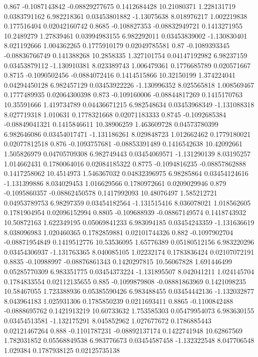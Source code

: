{0.867 -0.1087143842 -0.08829277675 0.1412684428 10.21080371 1.228131719 0.0383791162 6.982218361 0.03453801882 -1.13075638 8.018976217 1.002219838 0.177516404 0.02042160742
0.8685 -0.108827353 -0.08832949721 0.1413271955 10.2489279 1.27839461 0.03994983155 6.982292011 0.03453839002 -1.130830401 8.021192666 1.004362265 0.1775910179 0.02049785581
0.87 -0.1089393345 -0.08836766749 0.141388268 10.2858335 1.327101754 0.04147192982 6.98237159 0.03453879112 -1.130910381 8.023389743 1.006479361 0.1776685789 0.020571667
0.8715 -0.1090502456 -0.0884072416 0.1414515866 10.32150199 1.374224041 0.04294450128 6.982457129 0.03453922226 -1.130996352 8.025565818 1.008569467 0.1777489935 0.02064300398
0.873 -0.109160006 -0.08844817269 0.1415170763 10.35591666 1.419734789 0.04436671215 6.982548634 0.03453968349 -1.131088318 8.027719318 1.010631 0.1778321668 0.02071183333
0.8745 -0.1092685384 -0.08849041321 0.1415846611 10.38906259 1.463609728 0.04573780399 6.982646086 0.03454017471 -1.131186261 8.029848723 1.012662462 0.1779180021 0.02077812518
0.876 -0.1093757681 -0.08853391489 0.1416542638 10.42092661 1.505826979 0.04705709308 6.982749443 0.03454069571 -1.131290139 8.03195257 1.014662431 0.1780064016 0.02084185322
0.8775 -0.1094816235 -0.08857862888 0.1417258062 10.4514973 1.546367032 0.04832396975 6.98285864 0.03454124616 -1.131399886 8.034029453 1.016629566 0.1780972661 0.0209029946
0.879 -0.1095860357 -0.08862450578 0.1417992093 10.48076497 1.585212721 0.04953789753 6.98297359 0.03454182564 -1.131515416 8.036078021 1.018562605 0.1781904954 0.02096152994
0.8805 -0.109688939 -0.08867149574 0.1418743932 10.50872163 1.622349195 0.05069841233 6.983094185 0.03454243359 -1.131636619 8.038096983 1.020460365 0.1782859881 0.02101744326
0.882 -0.1097902704 -0.08871954849 0.1419512776 10.53536095 1.65776389 0.05180512156 6.983220296 0.03454306937 -1.131763365 8.040085105 1.02232174 0.1783836424 0.02107072191
0.8835 -0.10988997 -0.08876861343 0.1420297815 10.56067828 1.691446499 0.05285770309 6.983351775 0.03454373224 -1.131895507 8.042041211 1.024145704 0.1784833554 0.02112135655
0.885 -0.1099879808 -0.08881863969 0.1421098235 10.58467055 1.723388936 0.05385590426 6.983488455 0.03454442136 -1.132032877 8.043964183 1.025931306 0.1785850239 0.0211693411
0.8865 -0.1100842488 -0.0888695762 0.1421913219 10.60733632 1.753585303 0.05479954073 6.983630155 0.03454513581 -1.132175291 8.045852962 1.027677672 0.1786885443 0.02121467264
0.888 -0.1101787231 -0.08892137174 0.1422741948 10.62867569 1.782031852 0.05568849538 6.983776673 0.03454587458 -1.132322548 8.047706548 1.029384 0.1787938125 0.02125735138
}
